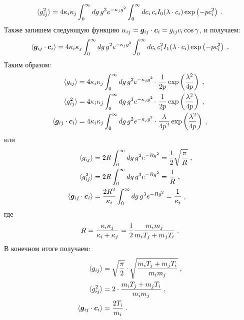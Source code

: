 \begin{equation}
  \langle g^2_{ij}\rangle = 4\kappa_i\kappa_j\int_{0}^{\infty}dg\,g^3e^{-\kappa_jg^2}\int_{0}^{\infty}dc_i\,c_i
  I_0(\lambda\cdot c_i)\exp\left(-pc^2_i\right)\;.
\end{equation}
Также запишем следующую функцию $\alpha_{ij} = \bm{g}_{ij}\cdot\bm{c}_i=g_{ij}c_i\cos\gamma$, и получаем:
\begin{equation}
  \langle \bm{g}_{ij}\cdot\bm{c}_i\rangle = 4\kappa_i\kappa_j\int_{0}^{\infty}dg\,g^2e^{-\kappa_jg^2}\int_{0}^{\infty}dc_i\,c^2_i
  I_1(\lambda\cdot c_i)\exp\left(-pc^2_i\right)\;.
\end{equation}
Таким образом:
\begin{equation}
  \begin{split}
    \langle g_{ij}\rangle &= 4\kappa_i\kappa_j\int_{0}^{\infty}dg\,g^2e^{-\kappa_jg^2}\cdot\frac{1}{2p}\exp\left(\frac{\lambda^2}{4p}\right)\;,\\
    \langle g^2_{ij}\rangle &= 4\kappa_i\kappa_j\int_{0}^{\infty}dg\,g^3e^{-\kappa_jg^2}\cdot\frac{1}{2p}\exp\left(\frac{\lambda^2}{4p}\right)\;,\\
    \langle \bm{g}_{ij}\cdot\bm{c}_i\rangle &= 4\kappa_i\kappa_j\int_{0}^{\infty}dg\,g^2e^{-\kappa_jg^2}\cdot\frac{\lambda}{4p^2}\exp\left(\frac{\lambda^2}{4p}\right)\;,
  \end{split}
\end{equation}
или
\begin{equation}
  \begin{split}
    \langle g_{ij}\rangle &= 2R\int_{0}^{\infty}dg\,g^2e^{-Rg^2}=\frac{1}{2}\sqrt{\frac{\pi}{R}}\;,\\
    \langle g^2_{ij}\rangle &= 2R\int_{0}^{\infty}dg\,g^3e^{-Rg^2}=\frac{1}{R}\;,\\
    \langle \bm{g}_{ij}\cdot\bm{c}_i\rangle &= \frac{2R^2}{\kappa_i}\int_{0}^{\infty}dg\,g^3e^{-Rg^2}=\frac{1}{\kappa_i}\;,
  \end{split}
\end{equation}
где 
\begin{equation}
  R=\frac{\kappa_i\kappa_j}{\kappa_i+\kappa_j}=\frac{1}{2}\frac{m_im_j}{m_iT_j+m_jT_i}\;.
\end{equation}
В конечном итоге получаем:
\begin{equation}
  \begin{split}
    \langle g_{ij}\rangle &= \sqrt{\frac{\pi}{2}}\cdot\sqrt{\frac{m_iT_j+m_jT_i}{m_im_j}}\;,\\
    \langle g^2_{ij}\rangle &= 2\cdot\frac{m_iT_j+m_jT_i}{m_im_j}\;,\\
    \langle \bm{g}_{ij}\cdot\bm{c}_i\rangle &= \frac{2T_i}{m_i}\;.
  \end{split}
\end{equation}

